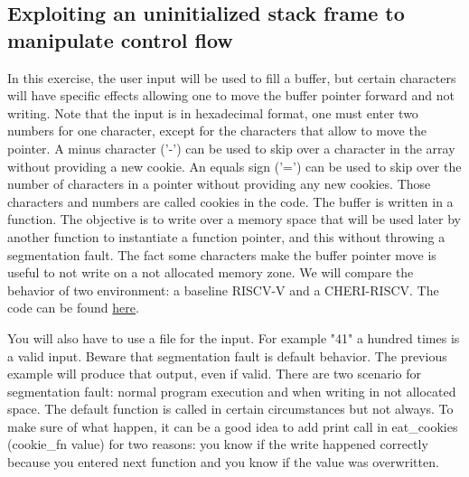 \documentclass[a4paper, 11pt]{article}
\begin{document}
	\subsection{Exploiting an uninitialized stack frame to manipulate control flow}
		In this exercise, the user input will be used to fill a buffer, but certain characters will have specific effects allowing one to move the buffer pointer forward and not writing. Note that the input is in hexadecimal format, one must enter two numbers for one character, except for the characters that allow to move the pointer.
		A minus character ('-') can be used to skip over a character in the array without providing a new cookie. An equals sign ('=') can be used to skip over the number of characters in a pointer without providing any new cookies. 
		Those characters and numbers are called cookies in the code.
		The buffer is written in a function. The objective is to write over a memory space that will be used later by another function to instantiate a function pointer, and this without throwing a segmentation fault.
		The fact some characters make the buffer pointer move is useful to not write on a not allocated memory zone.
		We will compare the behavior of two environment: a baseline RISCV-V and a CHERI-RISCV.
		The code can be found \href{https://ctsrd-cheri.github.io/cheri-exercises/missions/uninitialized-stack-frame-control-flow/index.html}{here}.
		
		You will also have to use a file for the input. For example "41" a hundred times is a valid input.
		Beware that segmentation fault is default behavior. The previous example will produce that output, even if valid. There are two scenario for segmentation fault: normal program execution and when writing in not allocated space.
		The default function is called in certain circumstances but not always.
		To make sure of what happen, it can be a good idea to add print call in eat\_cookies (cookie\_fn value) for two reasons: you know if the write happened correctly because you entered next function and you know if the value was overwritten. 
	
\end{document}

